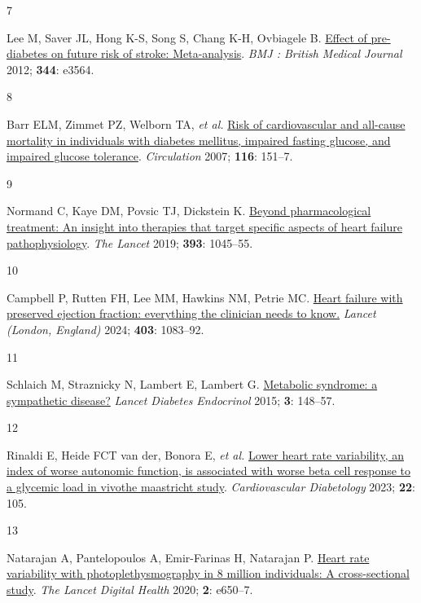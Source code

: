 \documentclass[
  a4paper,
  headsepline=true,
  open=any]{scrbook}
\newlength{\cslhangindent}
\newlength{\csllabelwidth}
\newlength{\cslentryspacingunit} %
\newenvironment{CSLReferences}[2] %
 {%
  \setlength{\parindent}{0pt}
  \ifodd #1
  \let\oldpar\par
  \def\par{\hangindent=\cslhangindent\oldpar}
  \fi
  \setlength{\parskip}{#2\cslentryspacingunit}
 }%
 {}
\newcommand{\CSLLeftMargin}[1]{\parbox[t]{\csllabelwidth}{#1}}
\newcommand{\CSLRightInline}[1]{\parbox[t]{\linewidth - \csllabelwidth}{#1}\break}
\begin{document}
\begin{CSLReferences}{0}{0}
\leavevmode{}%
\CSLLeftMargin{7 }%
\CSLRightInline{Lee M, Saver JL, Hong K-S, Song S, Chang K-H, Ovbiagele
B. \href{https://doi.org/10.1136/bmj.e3564}{Effect of pre-diabetes on
future risk of stroke: Meta-analysis}. \emph{BMJ : British Medical
Journal} 2012; \textbf{344}: e3564.}

\leavevmode{}%
\CSLLeftMargin{8 }%
\CSLRightInline{Barr ELM, Zimmet PZ, Welborn TA, \emph{et al.}
\href{https://doi.org/10.1161/CIRCULATIONAHA.106.685628}{Risk of
cardiovascular and all-cause mortality in individuals with diabetes
mellitus, impaired fasting glucose, and impaired glucose tolerance}.
\emph{Circulation} 2007; \textbf{116}: 151--7.}

\leavevmode{}%
\CSLLeftMargin{9 }%
\CSLRightInline{Normand C, Kaye DM, Povsic TJ, Dickstein K.
\href{https://doi.org/10.1016/S0140-6736(18)32216-5}{Beyond
pharmacological treatment: An insight into therapies that target
specific aspects of heart failure pathophysiology}. \emph{The Lancet}
2019; \textbf{393}: 1045--55.}

\leavevmode{}%
\CSLLeftMargin{10 }%
\CSLRightInline{Campbell P, Rutten FH, Lee MM, Hawkins NM, Petrie MC.
\href{https://doi.org/10.1016/S0140-6736(23)02756-3}{Heart failure with
preserved ejection fraction: everything the clinician needs to know.}
\emph{Lancet (London, England)} 2024; \textbf{403}: 1083--92.}

\leavevmode{}%
\CSLLeftMargin{11 }%
\CSLRightInline{Schlaich M, Straznicky N, Lambert E, Lambert G.
\href{https://doi.org/10.1016/s2213-8587(14)70033-6}{Metabolic syndrome:
a sympathetic disease?} \emph{Lancet Diabetes Endocrinol} 2015;
\textbf{3}: 148--57.}

\leavevmode{}%
\CSLLeftMargin{12 }%
\CSLRightInline{Rinaldi E, Heide FCT van der, Bonora E, \emph{et al.}
\href{https://doi.org/10.1186/s12933-023-01837-0}{Lower heart rate
variability, an index of worse autonomic function, is associated with
worse beta cell response to a glycemic load in vivo{\textemdash}the
maastricht study}. \emph{Cardiovascular Diabetology} 2023; \textbf{22}:
105.}

\leavevmode{}%
\CSLLeftMargin{13 }%
\CSLRightInline{Natarajan A, Pantelopoulos A, Emir-Farinas H, Natarajan
P. \href{https://doi.org/10.1016/S2589-7500(20)30246-6}{Heart rate
variability with photoplethysmography in 8 million individuals: A
cross-sectional study}. \emph{The Lancet Digital Health} 2020;
\textbf{2}: e650--7.}


\end{CSLReferences}
\end{document}

